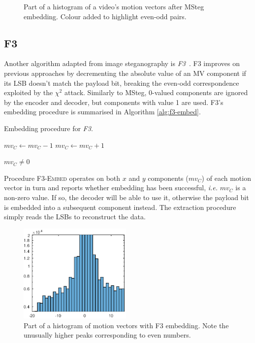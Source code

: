 \documentclass[12pt,british,twoside,notitlepage,usenames,dvipsnames,hypens,final]{report}
\numberwithin{equation}{section}
\numberwithin{figure}{section}
\begin{document}
\begin{figure}[tbh]
\centering
\resizebox{0.6\textwidth}{!}{}
\caption{Part of a histogram of a video's motion vectors after MSteg embedding. Colour added to highlight even-odd pairs.}
\label{fig:msteg-hist}
\end{figure}

\subsection{F3}

Another algorithm adapted from image steganography is \emph{F3}~\cite{f5}. F3 improves on previous approaches by decrementing the absolute value of an MV component if its LSB doesn't match the payload bit, breaking the even-odd correspondence exploited by the $\chi^2$ attack. Similarly to MSteg, 0-valued components are ignored by the encoder and decoder, but components with value 1 are used. F3's embedding procedure is summarised in Algorithm \ref{alg:f3-embed}.  

\begin{algorithm}[!htp]
\caption{Embedding procedure for \emph{F3}.}
\label{alg:f3-embed}
\begin{algorithmic}
\Else
        	\State $mv_C \gets mv_C - 1$
        \Else
        \State $mv_C \gets mv_C + 1$
        \EndIf
    \EndIf
    
    \State \Return $mv_C \neq 0$
\EndIf
\EndProcedure
\end{algorithmic}
\end{algorithm}

Procedure \textsc{F3-Embed} operates on both $x$ and $y$ components ($mv_C$) of each motion vector in turn and reports whether embedding has been successful, \emph{i.e.} $mv_C$ is a non-zero value. If so, the decoder will be able to use it, otherwise the payload bit is embedded into a subsequent component instead. The extraction procedure simply reads the LSBs to reconstruct the data.

\begin{figure}
\centering
\includegraphics[width=5.5cm]{img/f3-hist.eps}
\caption{Part of a histogram of motion vectors with F3 embedding. Note the unusually higher peaks corresponding to even numbers.}
\label{fig:f3-hist}
\end{figure}
\end{document}
